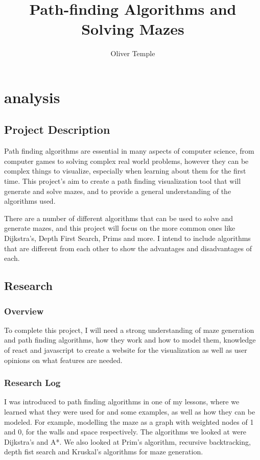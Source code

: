 \documentclass[titlepage]{article}
\title{Path-finding Algorithms and Solving Mazes}
\author{Oliver Temple}
\begin{document}
\maketitle
\tableofcontents

\section{analysis}
\subsection{Project Description}
Path finding algorithms are essential in many aspects of computer science, from computer games to solving complex real world problems, however they can be complex things to visualize, especially when learning about them for the first time. This project's aim to create a path finding visualization tool that will generate and solve mazes, and to provide a general understanding of the algorithms used. 

There are a number of different algorithms that can be used to solve and generate mazes, and this project will focus on the more common ones like Dijkstra's, Depth First Search, Prims and more. I intend to include algorithms that are different from each other to show the advantages and disadvantages of each.

\subsection{Research}
\subsubsection{Overview}
To complete this project, I will need a strong understanding of maze generation and path finding algorithms, how they work and how to model them, knowledge of react and javascript to create a website for the visualization as well as user opinions on what features are needed.
\subsubsection{Research Log}
I was introduced to path finding algorithms in one of my lessons, where we learned what they were used for and some examples, as well as how they can be modeled. For example, modelling the maze as a graph with weighted nodes of 1 and 0, for the walls and space respectively. The algorithms we looked at were Dijkstra's and A*. We also looked at Prim's algorithm, recursive backtracking, depth fist search and Kruskal's algorithms for maze generation.
\end{document}
